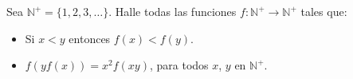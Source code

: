 Sea $\mathbb N^+=\{1,2,3,\dots \}$. Halle todas las funciones $f: \mathbb N^+\to \mathbb N^+$ tales que:
 \begin{itemize} 
 \item Si $x\lt y$ entonces $f(x) \lt f(y)$.
 \item $f\left(yf(x)\right)=x^2f(xy)$, para todos $x$, $y$ en $\mathbb N^+$.
 \end{itemize} 
